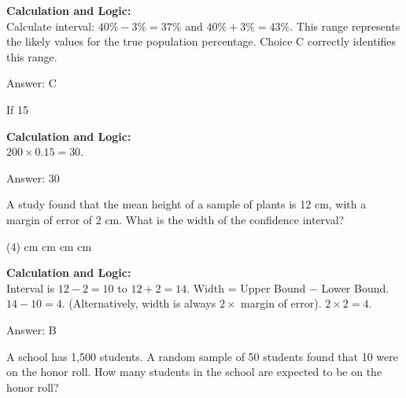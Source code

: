 \documentclass[11pt,paper=a4,answers]{exam}
\begin{document}
\begin{questions}
\begin{solution}
\textbf{Calculation and Logic:} \\
Calculate interval: $40\% - 3\% = 37\%$ and $40\% + 3\% = 43\%$. This range represents the likely values for the true population percentage. Choice C correctly identifies this range.

\vspace{30pt}

Answer: \colorbox{yellow!100}{C}
\end{solution}

\vspace{60pt}

\question
If 15%

\begin{solution}
\textbf{Calculation and Logic:} \\
$200 \times 0.15 = 30$.

\vspace{30pt}

Answer: \colorbox{yellow!100}{30}
\end{solution}

\vspace{60pt}

\question
A study found that the mean height of a sample of plants is 12 cm, with a margin of error of 2 cm. What is the width of the confidence interval?
\begin{tasks}(4)
     cm
     cm
     cm
     cm
\end{tasks}

\begin{solution}
\textbf{Calculation and Logic:} \\
Interval is $12 - 2 = 10$ to $12 + 2 = 14$. Width = Upper Bound $-$ Lower Bound. $14 - 10 = 4$. (Alternatively, width is always $2 \times$ margin of error). $2 \times 2 = 4$.

\vspace{30pt}

Answer: \colorbox{yellow!100}{B}
\end{solution}

\vspace{60pt}

\question
A school has 1,500 students. A random sample of 50 students found that 10 were on the honor roll. How many students in the school are expected to be on the honor roll?


\end{questions}
\end{document}
